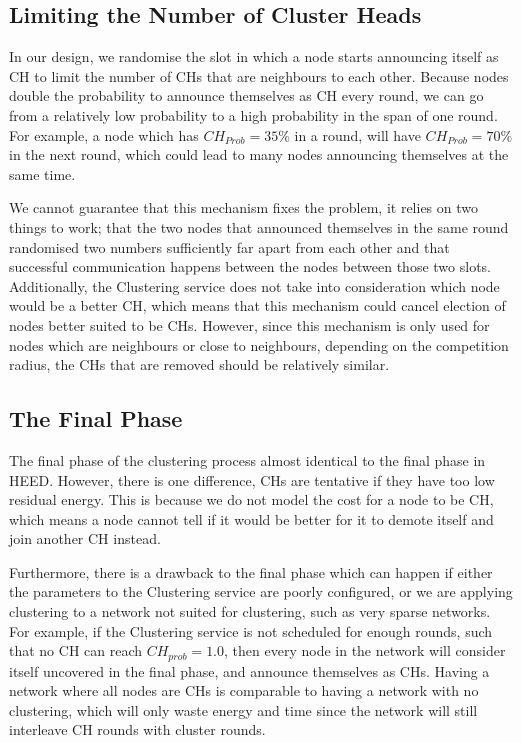\subsection{Limiting the Number of Cluster Heads}
\begin{newtext}
In our design, we randomise the slot in which a node starts announcing itself as CH to limit the number of CHs that are neighbours to each other. Because nodes double the probability to announce themselves as CH every round, we can go from a relatively low probability to a high probability in the span of one round. For example, a node which has $CH_{Prob} = 35\%$ in a round, will have $CH_{Prob} = 70\%$ in the next round, which could lead to many nodes announcing themselves at the same time.

We cannot guarantee that this mechanism fixes the problem, it relies on two things to work; that the two nodes that announced themselves in the same round randomised two numbers sufficiently far apart from each other and that successful communication happens between the nodes between those two slots. Additionally, the Clustering service does not take into consideration which node would be a better CH, which means that this mechanism could cancel election of nodes better suited to be CHs. However, since this mechanism is only used for nodes which are neighbours or close to neighbours, depending on the competition radius, the CHs that are removed should be relatively similar.
\end{newtext}


\subsection{The Final Phase}
\begin{newtext}
The final phase of the clustering process almost identical to the final phase in HEED. However, there is one difference, CHs are tentative if they have too low residual energy. This is because we do not model the cost for a node to be CH, which means a node cannot tell if it would be better for it to demote itself and join another CH instead. 

Furthermore, there is a drawback to the final phase which can happen if either the parameters to the Clustering service are poorly configured, or we are applying clustering to a network not suited for clustering, such as very sparse networks. For example, if the Clustering service is not scheduled for enough rounds, such that no CH can reach $CH_{prob} = 1.0$, then every node in the network will consider itself uncovered in the final phase, and announce themselves as CHs. Having a network where all nodes are CHs is comparable to having a network with no clustering, which will only waste energy and time since the network will still interleave CH rounds with cluster rounds.
\end{newtext}

